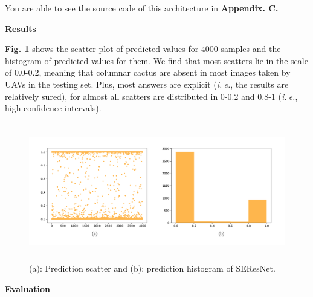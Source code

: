 \documentclass[a4paper]{article}
\begin{document}
\large{You are able to see the source code of this architecture in \textbf{Appendix. C.}}
\vspace{2mm}
\begin{center}
\large\textbf{Results} \\
\end{center}

\large{

\textbf{Fig. \ref{seresresults}} shows the scatter plot of predicted values for 4000 samples and the histogram of predicted values for them. We find that most scatters lie in the scale of 0.0-0.2, meaning that columnar cactus are absent in most images taken by UAVs in the testing set. Plus, most answers are explicit (\textit{i.$\ $e.}, the results are relatively sured), for almost all scatters are distributed in 0-0.2 and 0.8-1 (\textit{i.$\ $e.}, high confidence intervals).

}

\begin{figure}[h]
\centering
\includegraphics[width=15cm,height=6cm]{seres_best.pdf}
\caption{ (a): Prediction scatter and (b): prediction histogram of \textsf{SEResNet}.}
\label{seresresults}
\end{figure}

\vspace{2mm}
\begin{center}
\large\textbf{Evaluation} \\
\end{center}
\end{document}
